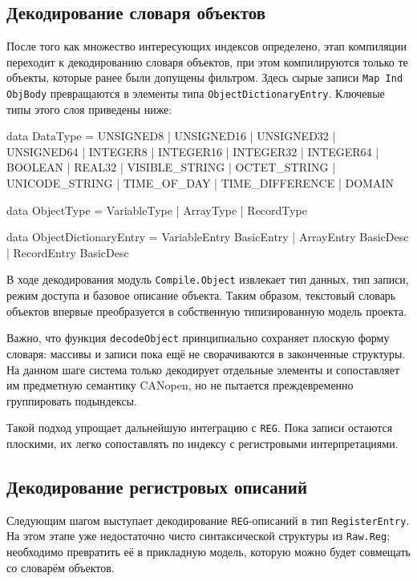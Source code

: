 \documentclass[a4paper,12pt]{article}
\begin{document}
\subsection{Декодирование словаря объектов}

После того как множество интересующих индексов определено, этап компиляции переходит к
декодированию словаря объектов, при этом компилируются только те объекты,
которые ранее были допущены фильтром. Здесь сырые записи \texttt{Map Ind ObjBody} превращаются
в элементы типа \texttt{ObjectDictionaryEntry}. Ключевые типы этого слоя приведены ниже:

\begin{flushleft}
\label{lst:ode-types}
\begin{MyCodes}
data DataType =
    UNSIGNED8 | UNSIGNED16 | UNSIGNED32 | UNSIGNED64
  | INTEGER8  | INTEGER16  | INTEGER32  | INTEGER64
  | BOOLEAN   | REAL32
  | VISIBLE_STRING | OCTET_STRING | UNICODE_STRING
  | TIME_OF_DAY | TIME_DIFFERENCE | DOMAIN

data ObjectType = VariableType | ArrayType | RecordType

data ObjectDictionaryEntry =
    VariableEntry BasicEntry
  | ArrayEntry  BasicDesc
  | RecordEntry BasicDesc
\end{MyCodes}
\end{flushleft}

В ходе декодирования модуль \texttt{Compile.Object} извлекает тип данных, тип записи,
режим доступа и базовое описание объекта. Таким образом, текстовый словарь объектов
впервые преобразуется в собственную типизированную модель проекта.

Важно, что функция \texttt{decodeObject} принципиально сохраняет плоскую форму словаря:
массивы и записи пока ещё не сворачиваются в законченные структуры. На данном шаге
система только декодирует отдельные элементы и
сопоставляет им предметную семантику CANopen, но не пытается преждевременно
группировать подындексы.

Такой подход упрощает дальнейшую интеграцию с \texttt{REG}. Пока записи остаются
плоскими, их легко сопоставлять по индексу с регистровыми интерпретациями.

\subsection{Декодирование регистровых описаний}

Следующим шагом выступает декодирование \texttt{REG}-описаний в тип \texttt{RegisterEntry}.
На этом этапе уже недостаточно чисто синтаксической структуры из \texttt{Raw.Reg};
необходимо превратить её в прикладную модель, которую можно будет совмещать со
словарём объектов.
\end{document}
